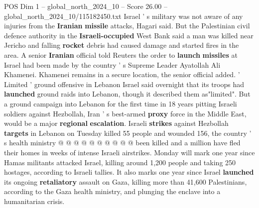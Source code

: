 \begin{textsample}{POS Dim 1 – global\_north\_2024\_10 – Score 26.00 – global\_north\_2024\_10/115182450.txt}
Israel ' s military was not aware of any injuries from the \textbf{Iranian} \textbf{missile} attacks, Hagari said.
But the Palestinian civil defence authority in the \textbf{Israeli-occupied} West Bank said a man was killed near Jericho and falling \textbf{rocket} debris had caused damage and started fires in the area.
A senior \textbf{Iranian} official told Reuters the order to \textbf{launch} \textbf{missiles} at Israel had been made by the country ' s Supreme Leader Ayatollah Ali Khamenei.
Khamenei remains in a secure location, the senior official added. ' Limited ' ground offensive in Lebanon Israel said overnight that its troops had \textbf{launched} ground raids into Lebanon, though it described them as"limited".
But a ground campaign into Lebanon for the first time in 18 years pitting Israeli soldiers against Hezbollah, Iran ' s best-armed \textbf{proxy} force in the Middle East, would be a major \textbf{regional} \textbf{escalation}.
Israeli \textbf{strikes} against Hezbollah \textbf{targets} in Lebanon on Tuesday killed 55 people and wounded 156, the country ' s health ministry @ @ @ @ @ @ @ @ @ @ been killed and a million have fled their homes in weeks of intense Israeli airstrikes.
Monday will mark one year since Hamas militants attacked Israel, killing around 1,200 people and taking 250 hostages, according to Israeli tallies.
It also marks one year since Israel \textbf{launched} its ongoing \textbf{retaliatory} assault on Gaza, killing more than 41,600 Palestinians, according to the Gaza health ministry, and plunging the enclave into a humanitarian crisis.

\end{textsample}
